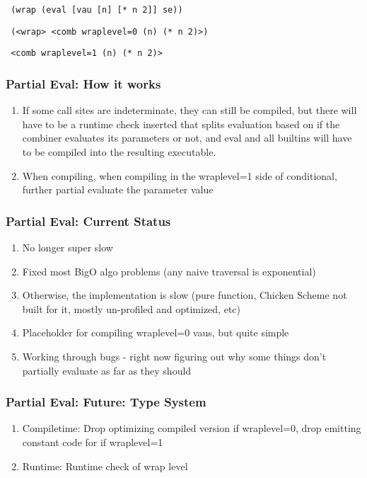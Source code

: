 \documentclass{beamer}
\begin{document}
\begin{frame}[fragile]
\footnotesize
\begin{verbatim}
 (wrap (eval [vau [n] [* n 2]] se))
\end{verbatim}
\end{frame}

\begin{frame}[fragile]
\footnotesize
\begin{verbatim}
 (<wrap> <comb wraplevel=0 (n) (* n 2)>)
\end{verbatim}
\end{frame}

\begin{frame}[fragile]
\footnotesize
\begin{verbatim}
 <comb wraplevel=1 (n) (* n 2)>
\end{verbatim}
\end{frame}

\begin{frame}
\frametitle{Partial Eval: How it works}
  \begin{enumerate}
	\item<1-> If some call sites are indeterminate, they can still be compiled, but there will have to be a runtime check inserted that splits evaluation based on if the combiner evaluates its parameters or not, and eval and all builtins will have to be compiled into the resulting executable.
    \item<2-> When compiling, when compiling in the wraplevel=1 side of conditional, further partial evaluate the parameter value
  \end{enumerate}
\end{frame}

\begin{frame}
\frametitle{Partial Eval: Current Status}
  \begin{enumerate}
    \item<1-> No longer super slow
    \item<2-> Fixed most BigO algo problems (any naive traversal is exponential)
	\item<3-> Otherwise, the implementation is slow (pure function, Chicken Scheme not built for it, mostly un-profiled and optimized, etc)
	\item<4-> Placeholder for compiling wraplevel=0 vaus, but quite simple
	\item<5-> Working through bugs - right now figuring out why some things don't partially evaluate as far as they should
  \end{enumerate}
\end{frame}

\begin{frame}
\frametitle{Partial Eval: Future: Type System}
  \begin{enumerate}
    \item<1-> Compiletime: Drop optimizing compiled version if wraplevel=0, drop emitting constant code for if wraplevel=1
    \item<2-> Runtime: Runtime check of wrap level
  \end{enumerate}
\end{frame}
\end{document}
